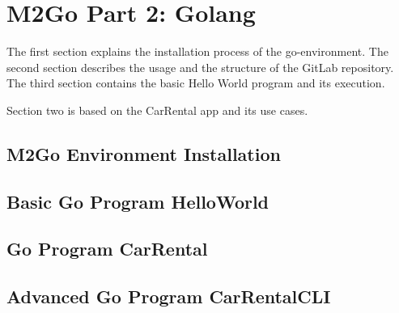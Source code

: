 \chapter{M2Go Part 2: Golang}
\label{cha:golang}
The first section explains the installation process of the go-environment.
The second section describes the usage and the structure of the GitLab repository.
The third section contains the basic Hello World program and its execution.

Section two is based on the CarRental app and its use cases.


\section{M2Go Environment Installation}




\section{Basic Go Program HelloWorld}



\section{Go Program CarRental}





\section{Advanced Go Program CarRentalCLI}


